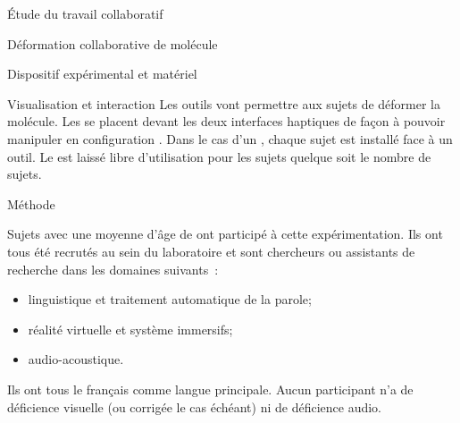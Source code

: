 \documentclass[myfrancais]{mythesis}
\begin{document}
\begin{mypart}{Étude du travail collaboratif}
\begin{mychapter}{Déformation collaborative de molécule}
\begin{mysection}{Dispositif expérimental et matériel}
\begin{mysubsection}{Visualisation et interaction}
					Les outils  vont permettre aux sujets de déformer la molécule.
					Les  se placent devant les deux interfaces haptiques de façon à pouvoir manipuler en configuration .
					Dans le cas d'un , chaque sujet est installé face à un outil.
					Le \mySpaceNavigator est laissé libre d'utilisation pour les sujets quelque soit le nombre de sujets.
				\end{mysubsection}
			\end{mysection}
			\begin{mysection}{Méthode}
				\begin{mysubsection}[sse-exp2-Sujets]{Sujets}
					 avec une moyenne d'âge de  ont participé à cette expérimentation.
					Ils ont tous été recrutés au sein du laboratoire  et sont chercheurs ou assistants de recherche dans les domaines suivants~:
					\begin{itemize}
						\item linguistique et traitement automatique de la parole;
						\item réalité virtuelle et système immersifs;
						\item audio-acoustique.
					\end{itemize}
					Ils ont tous le français comme langue principale.
					Aucun participant n'a de déficience visuelle (ou corrigée le cas échéant) ni de déficience audio.


\end{mysubsection}
\end{mysection}
\end{mychapter}
\end{mypart}
\end{document}
